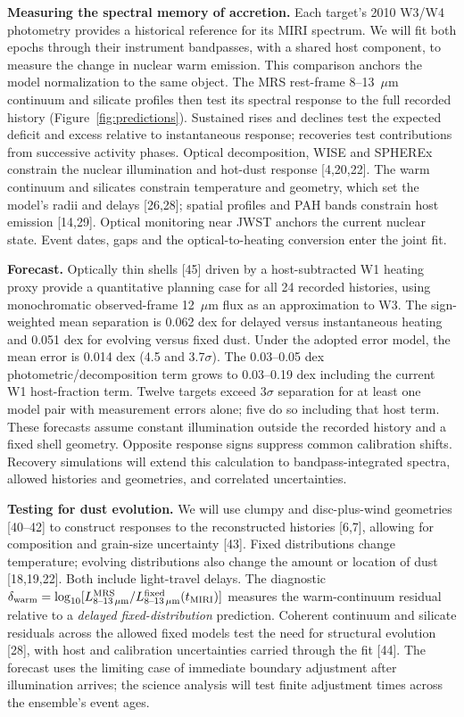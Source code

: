\documentclass[12pt]{article}
\begin{document}
\clearpage
\noindent\textbf{Measuring the spectral memory of accretion.}
Each target's 2010 W3/W4 photometry provides a historical reference for its MIRI spectrum. We will fit both epochs through their instrument bandpasses, with a shared host component, to measure the change in nuclear warm emission. This comparison anchors the model normalization to the same object. The MRS rest-frame 8--13~$\mu$m continuum and silicate profiles then test its spectral response to the full recorded history (Figure~\ref{fig:predictions}). Sustained rises and declines test the expected deficit and excess relative to instantaneous response; recoveries test contributions from successive activity phases. Optical decomposition, WISE and SPHEREx constrain the nuclear illumination and hot-dust response [4,20,22]. The warm continuum and silicates constrain temperature and geometry, which set the model's radii and delays [26,28]; spatial profiles and PAH bands constrain host emission [14,29]. Optical monitoring near JWST anchors the current nuclear state. Event dates, gaps and the optical-to-heating conversion enter the joint fit.

\noindent\textbf{Forecast.} Optically thin shells [45] driven by a host-subtracted W1 heating proxy provide a quantitative planning case for all 24 recorded histories, using monochromatic observed-frame 12~$\mu$m flux as an approximation to W3. The sign-weighted mean separation is 0.062 dex for delayed versus instantaneous heating and 0.051 dex for evolving versus fixed dust. Under the adopted error model, the mean error is 0.014 dex (4.5 and 3.7$\sigma$). The 0.03--0.05 dex photometric/decomposition term grows to 0.03--0.19 dex including the current W1 host-fraction term. Twelve targets exceed $3\sigma$ separation for at least one model pair with measurement errors alone; five do so including that host term. These forecasts assume constant illumination outside the recorded history and a fixed shell geometry. Opposite response signs suppress common calibration shifts. Recovery simulations will extend this calculation to bandpass-integrated spectra, allowed histories and geometries, and correlated uncertainties.

\noindent\textbf{Testing for dust evolution.}
We will use clumpy and disc-plus-wind geometries [40--42] to construct responses to the reconstructed histories [6,7], allowing for composition and grain-size uncertainty [43]. Fixed distributions change temperature; evolving distributions also change the amount or location of dust [18,19,22]. Both include light-travel delays. The diagnostic $\delta_{\rm warm}=\log_{10}[L^{\rm MRS}_{8\text{--}13\,\mu{\rm m}}/L^{\rm fixed}_{8\text{--}13\,\mu{\rm m}}(t_{\rm MIRI})]$ measures the warm-continuum residual relative to a \emph{delayed fixed-distribution} prediction. Coherent continuum and silicate residuals across the allowed fixed models test the need for structural evolution [28], with host and calibration uncertainties carried through the fit [44]. The forecast uses the limiting case of immediate boundary adjustment after illumination arrives; the science analysis will test finite adjustment times across the ensemble's event ages.
\end{document}
